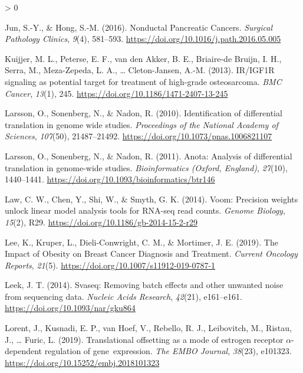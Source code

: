 \documentclass[
  12pt,
  openany]{book}
\newlength{\cslhangindent}
\newenvironment{CSLReferences}[2] %
 {%
  \setlength{\parindent}{0pt}
  \ifodd #1 \everypar{\setlength{\hangindent}{\cslhangindent}}\ignorespaces\fi
  \ifnum #2 > 0
  \setlength{\parskip}{#2\baselineskip}
  \fi
 }%
 {}
\begin{document}
\begin{CSLReferences}{1}{0}
\leavevmode\hypertarget{ref-Jun2016}{}%
Jun, S.-Y., \& Hong, S.-M. (2016). Nonductal {Pancreatic Cancers}. \emph{Surgical Pathology Clinics}, \emph{9}(4), 581--593. \url{https://doi.org/10.1016/j.path.2016.05.005}

\leavevmode\hypertarget{ref-Kuijjer2013}{}%
Kuijjer, M. L., Peterse, E. F., van den Akker, B. E., Briaire-de Bruijn, I. H., Serra, M., Meza-Zepeda, L. A., \ldots{} Cleton-Jansen, A.-M. (2013). {IR}/{IGF1R} signaling as potential target for treatment of high-grade osteosarcoma. \emph{BMC Cancer}, \emph{13}(1), 245. \url{https://doi.org/10.1186/1471-2407-13-245}

\leavevmode\hypertarget{ref-Larsson2010}{}%
Larsson, O., Sonenberg, N., \& Nadon, R. (2010). Identification of differential translation in genome wide studies. \emph{Proceedings of the National Academy of Sciences}, \emph{107}(50), 21487--21492. \url{https://doi.org/10.1073/pnas.1006821107}

\leavevmode\hypertarget{ref-Larsson2011}{}%
Larsson, O., Sonenberg, N., \& Nadon, R. (2011). Anota: {Analysis} of differential translation in genome-wide studies. \emph{Bioinformatics (Oxford, England)}, \emph{27}(10), 1440--1441. \url{https://doi.org/10.1093/bioinformatics/btr146}

\leavevmode\hypertarget{ref-Law2014}{}%
Law, C. W., Chen, Y., Shi, W., \& Smyth, G. K. (2014). Voom: Precision weights unlock linear model analysis tools for {RNA}-seq read counts. \emph{Genome Biology}, \emph{15}(2), R29. \url{https://doi.org/10.1186/gb-2014-15-2-r29}

\leavevmode\hypertarget{ref-Lee2019}{}%
Lee, K., Kruper, L., Dieli-Conwright, C. M., \& Mortimer, J. E. (2019). The {Impact} of {Obesity} on {Breast Cancer Diagnosis} and {Treatment}. \emph{Current Oncology Reports}, \emph{21}(5). \url{https://doi.org/10.1007/s11912-019-0787-1}

\leavevmode\hypertarget{ref-Leek2014}{}%
Leek, J. T. (2014). Svaseq: Removing batch effects and other unwanted noise from sequencing data. \emph{Nucleic Acids Research}, \emph{42}(21), e161--e161. \url{https://doi.org/10.1093/nar/gku864}

\leavevmode\hypertarget{ref-Lorent2019}{}%
Lorent, J., Kusnadi, E. P., van Hoef, V., Rebello, R. J., Leibovitch, M., Ristau, J., \ldots{} Furic, L. (2019). Translational offsetting as a mode of estrogen receptor {\(\alpha\)}-dependent regulation of gene~expression. \emph{The EMBO Journal}, \emph{38}(23), e101323. \url{https://doi.org/10.15252/embj.2018101323}


\end{CSLReferences}
\end{document}
